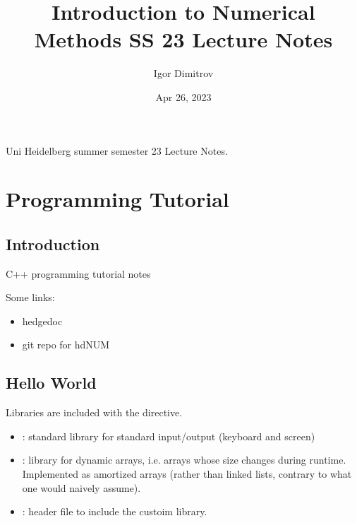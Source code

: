 \documentclass[a4paper,10pt,english]{jupyterBook}
\title{Introduction to Numerical Methods SS 23 Lecture Notes}
\date{Apr 26, 2023}
\author{Igor Dimitrov}
\begin{document}
\pagestyle{empty}
\sphinxmaketitle
\pagestyle{plain}
\sphinxtableofcontents
\pagestyle{normal}
\label{\detokenize{text/intro::doc}}


\sphinxAtStartPar
{} Uni Heidelberg summer semester 23 Lecture Notes.

\sphinxstepscope


\part{Programming Tutorial}

\sphinxstepscope


\chapter{Introduction}
\label{\detokenize{text/progtut/intro:introduction}}\label{\detokenize{text/progtut/intro::doc}}
\sphinxAtStartPar
C++ programming tutorial notes

\sphinxAtStartPar
Some links:
\begin{itemize}
\item {} 
\sphinxAtStartPar
hedgedoc 

\item {} 
\sphinxAtStartPar
git repo for hdNUM 

\end{itemize}

\sphinxstepscope


\chapter{Hello World}
\label{\detokenize{text/progtut/hello:hello-world}}\label{\detokenize{text/progtut/hello::doc}}
\sphinxAtStartPar
Libraries are included with the  directive.
\begin{itemize}
\item {} 
\sphinxAtStartPar
{}: standard library for standard input/output (keyboard and screen)

\item {} 
\sphinxAtStartPar
{}: library for dynamic arrays, i.e. arrays whose size changes during run\sphinxhyphen{}time. Implemented as amortized arrays (rather than linked lists, contrary to what one would naively assume).

\item {} 
\sphinxAtStartPar
{}: header file to include the custoim  library.

\end{itemize}
\end{document}

